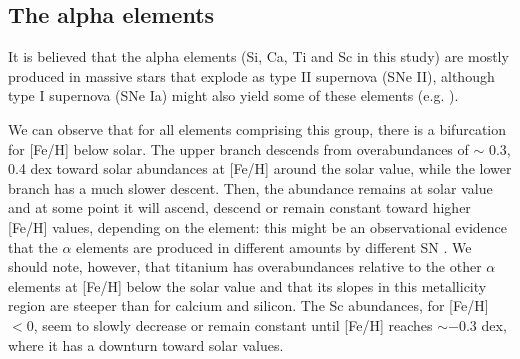\documentclass[oldversion]{aa}
\begin{document}
\subsection{The alpha elements}

It is believed that the alpha elements (Si, Ca, Ti and Sc in this study) are mostly produced in massive stars that explode as type II supernova (SNe II), although type I supernova (SNe Ia) might also yield some of these elements (e.g. \citeauthor{Thielemann-2002} \citeyear{Thielemann-2002}). %

We can observe that for all elements comprising this group, there is a bifurcation for [Fe/H] below solar. The upper branch descends from overabundances of $\sim$ 0.3, 0.4 dex toward solar abundances at [Fe/H] around the solar value, while the lower branch has a much slower descent. Then, the abundance remains at solar value and at some point it will ascend, descend or remain constant toward higher [Fe/H] values, depending on the element: this might be an observational evidence that the $\alpha$ elements are produced in different amounts by different SN \citep{McWilliam-1997}. We should note, however, that titanium has overabundances relative to the other $\alpha$ elements at [Fe/H] below the solar value and that its slopes in this metallicity region are steeper than for calcium and silicon. The Sc abundances, for [Fe/H] $< 0$, seem to slowly decrease or remain constant until [Fe/H] reaches $\sim-0.3$ dex, where it has a downturn toward solar values.

\end{document}
